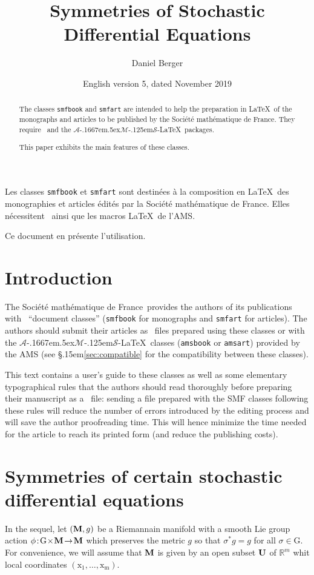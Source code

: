 \documentclass[11pt,english]{smfart}
\title{Symmetries of Stochastic Differential Equations}
\date {English version 5, dated November 2019}
\author{Daniel Berger}
\newcommand{\SmF}{Soci\'et\'e ma\-th\'e\-ma\-ti\-que de France}
\newcommand{\T}{\S\kern .15em\relax }
\newcommand{\AMS}{$\mathcal{A}$\kern-.1667em\lower.5ex\hbox
        {$\mathcal{M}$}\kern-.125em$\mathcal{S}$}
\newcommand{\M}{{\bf{M}}}
\newcommand{\G}{{\textrm{G}}}
\newcommand{\U}{{\bf{U}}}
\newcommand{\Rm}{{\mathbb{R}}^{m}}
\newcommand{\dbp}{\!:\!}
\newcommand{\arr}{\!\rightarrow\!}
\newcommand{\tim}{\!\times\!}
\begin{document}
\def\smfbyname{}

\begin{abstract}
The classes \texttt{smfbook} and \texttt{smfart} are intended to help the preparation in \LaTeX\ of the monographs and articles to be published by the \SmF. They require \LaTeXe\ and the \AMS-\LaTeX\ packages.\par
This paper exhibits the main features of these classes.
\end{abstract}

\begin{altabstract}
Les classes \texttt{smfbook} et \texttt{smfart} sont destin\'ees \`a la composition en \LaTeX\ des monographies et articles \'edit\'es par la \SmF. Elles n\'ecessitent \LaTeXe\ ainsi que les macros \LaTeX\ de l'AMS.\par
Ce document en pr\'esente l'utilisation.
\end{altabstract}
\maketitle

\tableofcontents

\section{Introduction}
The \SmF\ provides the authors of its publications with \LaTeXe\ ``document classes'' (\texttt{smfbook} for monographs and \texttt{smfart} for articles). The authors should submit their articles as \LaTeXe\ files prepared using these classes or with the \AMS-\LaTeX\ classes (\texttt{amsbook} or \texttt{amsart}) provided by the AMS (see \T\ref{sec:compatible} for the compatibility between these classes).

This text contains a user's guide to these classes as well as some elementary typographical rules that the authors should read thoroughly before preparing their manuscript as a \LaTeXe\ file: sending a file prepared with the SMF classes following these rules will reduce the number of errors introduced by the editing process and will save the author proofreading time. This will hence minimize the time needed for the article to reach its printed form (and reduce the publishing costs).


\section{Symmetries of certain stochastic differential equations}
In the sequel, let $(\M, g)$ be a Riemannain manifold with a smooth Lie group action $\phi\dbp\G\tim\M\arr\M$ which preserves the metric $g$ so that $\sigma^{*}g=g$ for all $\sigma\in \G$. For convenience, we will assume that $\M$ is given by an open subset $\U$ of $\Rm$ whit local coordinates $\mathrm{(x_1,\dots,x_m)}$. 
\end{document}
